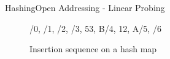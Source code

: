 \begin{frame}{Hashing}{Open Addressing - Linear Probing}
\begin{itemize}
\begin{figure}[!h]
{          \relax/0,
          \relax/1,
          \relax/2,
          \relax/3,
          {53, {\color{green2}B}}/4,
          {12, {\color{green2}A}}/5,
          \relax/6
        }%
        \def\LPEShowIndex{0}%
        \begin{adjustbox}{width=0.75\linewidth}%
        \end{adjustbox}
        \vspace{-0.5em}%
        \caption{Insertion sequence on a hash map}%
        \label{fig:hashing:open_addressing:linear_probing_example2}%
      \end{figure}
  \end{itemize}
\end{frame}


